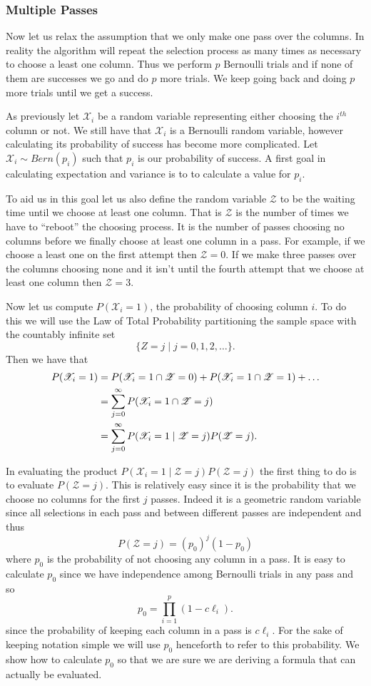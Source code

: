 \documentclass{book}
\begin{document}
\subsubsection{Multiple Passes}

Now let us relax the assumption that we only make one pass over the columns. In reality the algorithm will repeat the selection process as many times as necessary to choose a least one column. Thus we perform $p$ Bernoulli trials and if none of them are successes we go and do $p$ more trials. We keep going back and doing $p$ more trials until we get a success.

As previously let $\mathscr{X}_i$ be a random variable representing either choosing the $i^{th}$ column or not. We still have that $\mathscr{X}_i$ is a Bernoulli random variable, however calculating its probability of success has become more complicated. Let $\mathscr{X}_i \sim Bern(p_i)$ such that $p_i$ is our probability of success. A first goal in calculating expectation and variance is to to calculate a value for $p_i$. 

To aid us in this goal let us also define the random variable $\mathscr{Z}$ to be the waiting time until we choose at least one column. That is $\mathscr{Z}$ is the number of times we have to ``reboot'' the choosing process. It is the number of passes choosing no columns before we finally choose at least one column in a pass. For example, if we choose a least one on the first attempt then $\mathscr{Z}=0$. If we make three passes over the columns choosing none and it isn't until the fourth attempt that we choose at least one column then $\mathscr{Z}=3$. 

Now let us compute  $P(\mathscr{X}_i=1)$, the probability of choosing column $i$. To do this we will use the Law of Total Probability partitioning the sample space with the countably infinite set
$$
\{Z=j \mid j=0,1,2,\ldots\}.
$$
Then we have that
\begin{align}
P(\mathscr{X}_i=1)&=P(\mathscr{X}_i=1 \cap \mathscr{Z}=0)+P(\mathscr{X}_i=1 \cap \mathscr{Z}=1)+\ldots\notag\\
&=\sum_{j=0}^{\infty} P(\mathscr{X}_i=1 \cap \mathscr{Z}=j)\notag\\
&=\sum_{j=0}^{\infty} P(\mathscr{X}_i=1 \mid \mathscr{Z}=j)P(\mathscr{Z}=j).\notag
\end{align}

In evaluating the product $P(\mathscr{X}_i=1 \mid \mathscr{Z}=j)P(\mathscr{Z}=j)$ the first thing to do is to evaluate $P(\mathscr{Z}=j)$. This is relatively easy since it is the probability that we choose no columns for the first $j$ passes. Indeed it is a geometric random variable since all selections in each pass and between different passes are independent and thus 
$$
P(\mathscr{Z}=j)=(p_0)^j(1-p_0)
$$
where $p_0$ is the probability of not choosing any column in a pass. It is easy to calculate $p_0$ since we have independence among Bernoulli trials in any pass and so
$$
p_0=\prod_{i=1}^{p}(1-c\ell_i).
$$
since the probability of keeping each column in a pass is $c\ell_i$. For the sake of keeping notation simple we will use $p_0$ henceforth to refer to this probability. We show how to calculate $p_0$ so that we are sure we are deriving a formula that can actually be evaluated. 
\end{document}
